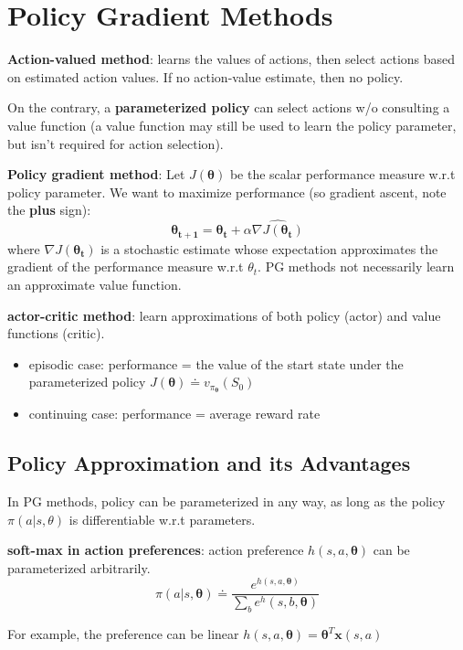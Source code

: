 \documentclass[sutton_barto_notes.tex]{subfiles}
\begin{document}
\newpage
\section{Policy Gradient Methods}

\textbf{Action-valued method}: learns the values of actions, then select actions based on estimated action values. If no action-value estimate, then no policy.

On the contrary, a \textbf{parameterized policy} can select actions w/o consulting a value function (a value function may still be used to learn the policy parameter, but isn't required for action selection).

\textbf{Policy gradient method}:
Let $J(\bm{\theta})$ be the scalar performance measure w.r.t policy parameter. We want to maximize performance (so gradient ascent, note the \textbf{plus} sign):
$$ \bm{\theta_{t+1}} = \bm{\theta_t} + \alpha \widehat{\nabla J(\bm{\theta_t})}$$
where $\widehat{\nabla J(\bm{\theta_t})}$ is a stochastic estimate whose expectation approximates the gradient of the performance measure w.r.t $\theta_t$. PG methods not necessarily learn an approximate value function.

\textbf{actor-critic method}: learn approximations of both policy (actor) and value functions (critic).

\begin{itemize}
\item episodic case: performance = the value of the start state under the parameterized policy $J(\bm{\theta}) \doteq v_{\pi_{\bm{\theta}}}(S_0)$
\item continuing case: performance = average reward rate
\end{itemize}

\subsection{Policy Approximation and its Advantages}

In PG methods, policy can be parameterized in any way, as long as the policy $\pi(a|s,\theta)$ is differentiable w.r.t parameters.

\begin{definition}
\textbf{soft-max in action preferences}: action preference $h(s,a,\bm{\theta})$ can be parameterized arbitrarily.
$$ \pi(a|s,\bm{\theta}) \doteq \frac{e^{h(s,a,\bm{\theta})}}{\sum_b e^h(s,b,\bm{\theta})}$$
\end{definition}
For example, the preference can be linear $h(s,a,\bm{\theta}) = \bm{\theta}^T \bm{x}(s,a)$
\end{document}
